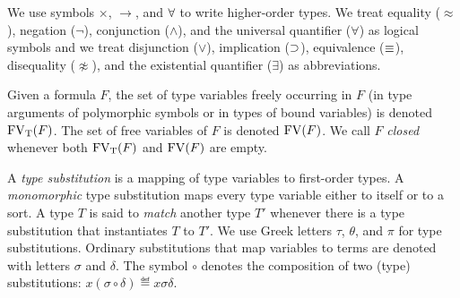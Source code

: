 We use symbols ${\times}$, ${\to}$, and ${\forall}$
to write higher-order types. We treat equality ($\approx$),
negation ($\lnot$), conjunction ($\land$), and the universal
quantifier ($\forall$) as logical symbols and we treat
disjunction ($\lor$), implication ($\supset$), equivalence
($\equiv$), disequality ($\not\approx$), and the existential
quantifier ($\exists$) as abbreviations.

Given a formula $F$, the set of type variables
freely occurring in $F$ (in type arguments of
polymorphic symbols or in types of bound variables)
is denoted $\mathrm{FV}_\mathrm{T}(F)$. The set of free variables of $F$
is denoted $\mathrm{FV}(F)$. We call $F$ {\em closed\/}
whenever both $\mathrm{FV}_\mathrm{T}(F)$ and $\mathrm{FV}(F)$ are empty.

A {\em type substitution\/} is a mapping of type variables
to first-order types. A {\em monomorphic\/} type substitution
maps every type variable either to itself or to a sort.
%
A type $T$ is said to {\em match\/} another
type $T'$ whenever there is a type substitution
that instantiates $T$ to $T'$.
We use Greek letters $\tau$, $\theta$, and $\pi$ for type
substitutions.
Ordinary substitutions that map variables to terms
are denoted with letters $\sigma$ and $\delta$.
The symbol $\circ$ denotes the composition
of two (type) substitutions:
$x(\sigma \circ \delta) \eqdef x\sigma\delta$.

